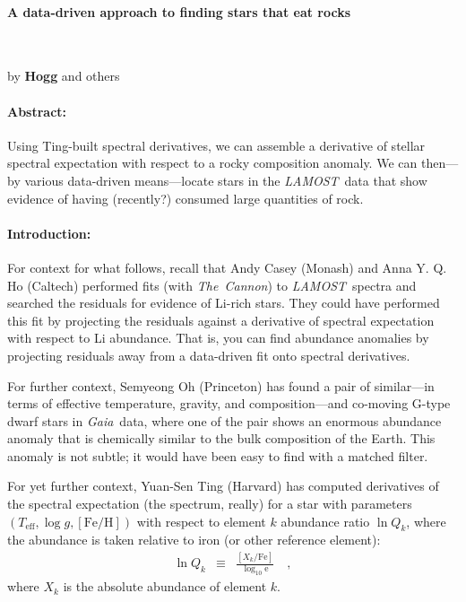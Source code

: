 \documentclass[12pt]{article}
\newcommand{\project}[1]{\textsl{#1}}
\newcommand{\acronym}[1]{{\small{#1}}}
\newcommand{\LAMOST}{\project{\acronym{LAMOST}}}
\newcommand{\TheCannon}{\project{The~Cannon}}
\newcommand{\Gaia}{\project{Gaia}}
\newcommand{\e}{\mathrm{e}}
\newcommand{\teff}{T_{\mathrm{eff}}}
\newcommand{\logg}{\log g}
\newcommand{\feh}{[\mathrm{Fe}/\mathrm{H}]}
\begin{document}
\raggedbottom\sloppy\sloppypar\frenchspacing

\paragraph{A data-driven approach to finding stars that eat rocks}
~

\noindent
by \textbf{Hogg} and others

\paragraph{Abstract:}
Using Ting-built spectral derivatives,
we can assemble a derivative of stellar spectral expectation with respect
to a rocky composition anomaly.
We can then---by various data-driven means---locate stars in the
\LAMOST\ data that show evidence of having (recently?) consumed
large quantities of rock.

\paragraph{Introduction:}
For context for what follows, recall that Andy Casey (Monash) and Anna
Y. Q. Ho (Caltech) performed fits (with \TheCannon) to
\LAMOST\ spectra and searched the residuals for evidence of
Li-rich stars.
They could have performed this fit by projecting the
residuals against a derivative of spectral expectation with respect
to Li abundance.
That is, you can find abundance anomalies by projecting residuals away
from a data-driven fit onto spectral derivatives.

For further context, Semyeong Oh (Princeton) has found a pair of similar---in
terms of effective temperature, gravity, and composition---and
co-moving G-type dwarf stars in \Gaia\ data, where one of the pair
shows an enormous abundance anomaly that is chemically similar to the
bulk composition of the Earth.
This anomaly is not subtle; it would have been easy to find with a matched
filter.

For yet further context, Yuan-Sen Ting (Harvard) has computed derivatives
of the spectral expectation (the spectrum, really) for a star with parameters
$(\teff, \logg, \feh)$ with respect to element $k$ abundance ratio $\ln Q_k$,
where the abundance is taken relative to iron (or other reference element):
\begin{eqnarray}
\ln Q_k &\equiv& \frac{[X_k / \mathrm{Fe}]}{\log_{10} \e}
\quad ,
\end{eqnarray}
where $X_k$ is the absolute abundance of element $k$.
\end{document}
